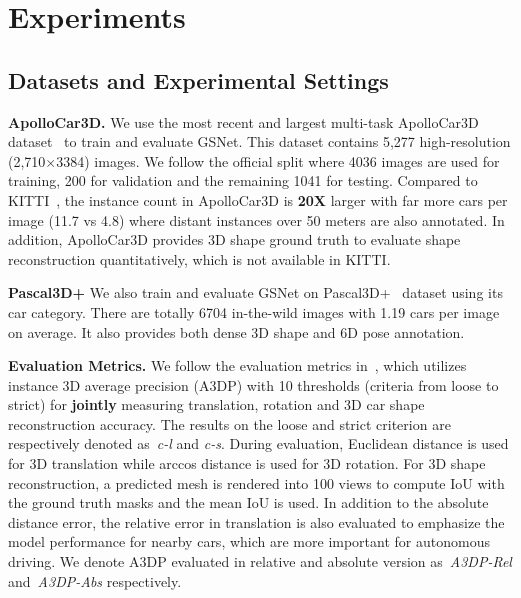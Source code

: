 \documentclass[runningheads]{llncs}
\begin{document}
\section{Experiments}
\label{sec:exp} 
\subsection{Datasets and Experimental Settings}

\smallskip\noindent\textbf{ApolloCar3D.}
We use the most recent and largest multi-task ApolloCar3D dataset~\cite{song2019apollocar3d} to train and evaluate GSNet. This dataset contains 5,277 high-resolution (2,710$\times$3384) images. We follow the official split where 4036 images are used for training, 200 for validation and the remaining 1041 for testing. Compared to KITTI~\cite{geiger2012we}, the instance count in ApolloCar3D is \textbf{20X} larger with far more cars per image (11.7 vs 4.8) where distant instances over 50 meters are also annotated. In addition,  ApolloCar3D provides 3D shape ground truth to evaluate shape reconstruction quantitatively, which is not available in KITTI.

\smallskip\noindent\textbf{Pascal3D+}
We also train and evaluate GSNet on Pascal3D+~\cite{xiang2014beyond} dataset using its car category. There are totally 6704 in-the-wild images with 1.19 cars per image on average. It also provides both dense 3D shape and 6D pose annotation.

\smallskip\noindent\textbf{Evaluation Metrics.}
We follow the evaluation metrics in~\cite{song2019apollocar3d}, which utilizes instance 3D average precision (A3DP)  with 10 thresholds (criteria from loose to strict) for \textbf{jointly} measuring translation, rotation and 3D car shape reconstruction accuracy. The results on the loose and strict criterion are respectively denoted as~\textit{c-l} and \textit{c-s}. During evaluation, Euclidean distance is used for 3D translation while arccos distance is used for 3D rotation. For 3D shape reconstruction, a predicted mesh is rendered into 100 views to compute IoU with the ground truth masks and the mean IoU is used. In addition to the absolute distance error, the relative error in translation is also evaluated to emphasize the model performance for nearby cars, which are more important for autonomous driving. We denote A3DP evaluated in relative and absolute version as~\textit{A3DP-Rel} and~\textit{A3DP-Abs} respectively.
\end{document}
